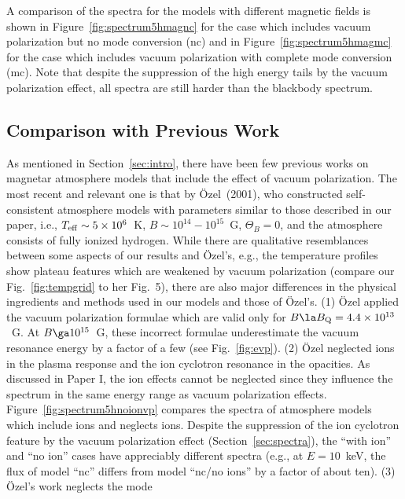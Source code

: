 \documentclass{mn2e}
\newcommand{\Teff}{T_{\rm eff}}
\newcommand{\Bq}{B_{\rm Q}}
\newcommand{\Thetab}{\Theta_B}
\newcommand{\holai}{Paper I}
\begin{document}
{A comparison of the spectra for the models with different magnetic
fields is shown in Figure~\ref{fig:spectrum5hmagnc} for the case which
includes vacuum polarization but no mode conversion (nc) and in
Figure~\ref{fig:spectrum5hmagmc} for the case which includes
vacuum polarization with complete mode conversion (mc).
Note that despite the suppression of the high energy tails by the
vacuum polarization effect, all spectra are still harder than the
blackbody spectrum.

\subsection{Comparison with Previous Work} \label{sec:saturation}

As mentioned in Section~\ref{sec:intro}, there have been few previous
works on magnetar atmosphere models that include the effect of
vacuum polarization.  The most recent and relevant one is that
by \"{O}zel~(2001), who constructed self-consistent atmosphere
models with parameters similar to those described in our paper, i.e.,
$\Teff\sim 5\times 10^6$~K, $B\sim 10^{14}-10^{15}$~G, $\Thetab=0$,
and the atmosphere consists of fully ionized hydrogen.
While there are qualitative resemblances between some aspects of our
results and \"{O}zel's, e.g., the temperature profiles show plateau
features which are weakened by vacuum polarization
(compare our Fig.~\ref{fig:tempgrid} to her Fig.~5),
there are also major differences
in the physical ingredients and methods used in our models and
those of \"{O}zel's.
(1) \"{O}zel applied the vacuum polarization formulae which
are valid only for $B\la\Bq=4.4\times 10^{13}$~G.  At $B\ga 10^{15}$~G,
these incorrect formulae underestimate the vacuum resonance
energy by a factor of a few (see Fig.~\ref{fig:evp}).
(2) \"{O}zel neglected ions in the plasma response and the ion
cyclotron resonance in the opacities.  As discussed in \holai, the
ion effects cannot be neglected since they influence the spectrum
in the same energy range as vacuum polarization effects.
Figure~\ref{fig:spectrum5hnoionvp} compares the spectra of
atmosphere models which include ions and neglects ions.
Despite the suppression of the ion cyclotron feature by the
vacuum polarization effect (Section~\ref{sec:spectra}), the
``with ion'' and ``no ion'' cases have appreciably different
spectra (e.g., at $E=10$~keV, the flux of model ``nc'' differs
from model ``nc/no ions'' by a factor of about ten).
(3) \"{O}zel's work neglects the mode
}
\end{document}
